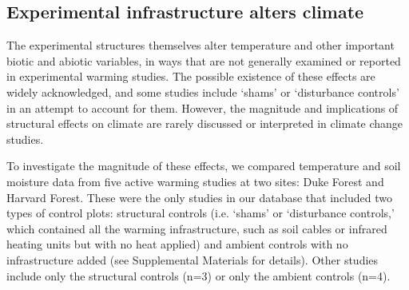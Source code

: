 \documentclass{article}
\begin{document}
\subsection* {Experimental infrastructure alters climate}
The experimental structures themselves alter temperature and other important biotic and abiotic variables, in ways that are not generally examined or reported in experimental warming studies. The possible existence of these effects are widely acknowledged, and some studies include `shams' or `disturbance controls' in an attempt to account for them. However, the magnitude and implications of structural effects on climate are rarely discussed or interpreted in climate change studies.

\par To investigate the magnitude of these effects, we compared temperature and soil moisture data from five active warming studies at two sites: Duke Forest and Harvard Forest\citep{farnsworth1995,clark2014a, marchin2015, pelini2011}. These were the only studies in our database that included two types of control plots: structural controls (i.e. `shams' or `disturbance controls,' which contained all the warming infrastructure, such as soil cables or infrared heating units but with no heat applied) and ambient controls with no infrastructure added (see Supplemental Materials for details). Other studies include only the structural controls (n=3) or only the ambient controls (n=4).

\end{document}
